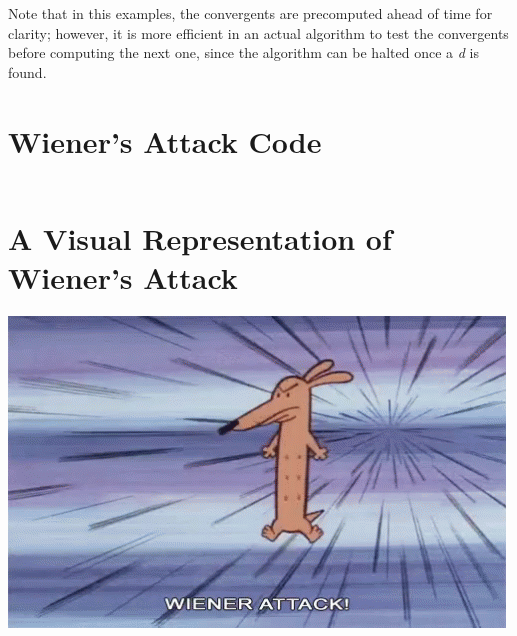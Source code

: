 \documentclass[11pt]{article}
\begin{document}
\begin{appendices}
Note that in this examples, the convergents are precomputed ahead of time for clarity; however, it is more efficient in an actual algorithm to test the convergents before computing the next one, since the algorithm can be halted once a \emph{d} is found.

\section{Wiener's Attack Code}
\inputminted{python}{./test.py}

\section{A Visual Representation of Wiener's Attack}
\includegraphics{./tenor-0.png}

\end{appendices}

\medskip



\end{document}
